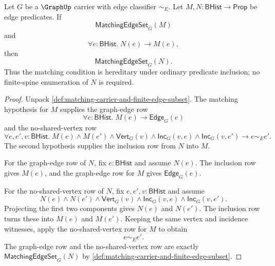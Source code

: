 \begin{theorem}
\label{thm:matching-abstract-subpredicate-closure}
Let $G$ be a $\GraphUp$ carrier with edge classifier $\sim_E$. Let $M,N:\mathsf{BHist}\to\mathsf{Prop}$ be edge predicates. If
$$
\mathsf{MatchingEdgeSet}_G(M)
$$
and
$$
\forall e:\mathsf{BHist}.\;N(e)\to M(e),
$$
then
$$
\mathsf{MatchingEdgeSet}_G(N).
$$
Thus the matching condition is hereditary under ordinary predicate inclusion; no finite-spine enumeration of $N$ is required.
\end{theorem}
\begin{proof}
Unpack \autoref{def:matching-carrier-and-finite-edge-subset}. The matching hypothesis for $M$ supplies the graph-edge row
$$
\forall e:\mathsf{BHist}.\;M(e)\to\mathsf{Edge}_G(e)
$$
and the no-shared-vertex row
$$
\forall e,e',v:\mathsf{BHist}.\;
M(e)\land M(e')\land\mathsf{Vert}_G(v)\land\mathsf{Inc}_G(v,e)\land\mathsf{Inc}_G(v,e')
\to e\sim_E e'.
$$
The second hypothesis supplies the inclusion row from $N$ into $M$.

For the graph-edge row of $N$, fix $e:\mathsf{BHist}$ and assume $N(e)$. The inclusion row gives $M(e)$, and the graph-edge row for $M$ gives $\mathsf{Edge}_G(e)$.

For the no-shared-vertex row of $N$, fix $e,e',v:\mathsf{BHist}$ and assume
$$
N(e)\land N(e')\land\mathsf{Vert}_G(v)\land\mathsf{Inc}_G(v,e)\land\mathsf{Inc}_G(v,e').
$$
Projecting the first two components gives $N(e)$ and $N(e')$. The inclusion row turns these into $M(e)$ and $M(e')$. Keeping the same vertex and incidence witnesses, apply the no-shared-vertex row for $M$ to obtain
$$
e\sim_E e'.
$$
The graph-edge row and the no-shared-vertex row are exactly $\mathsf{MatchingEdgeSet}_G(N)$ by \autoref{def:matching-carrier-and-finite-edge-subset}.
\end{proof}

